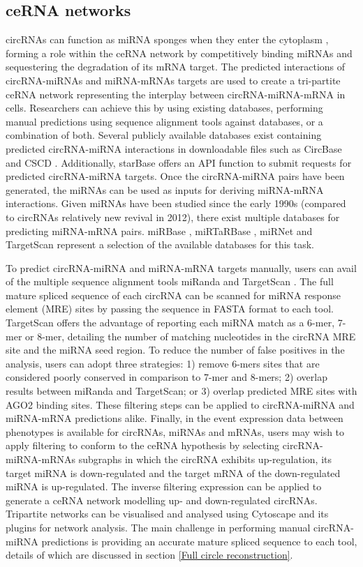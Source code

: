\documentclass[journal,review,submit,pdftex,moreauthors]{Definitions/mdpi}
\begin{document}
\subsection*{ceRNA networks}
circRNAs can function as miRNA sponges when they enter the cytoplasm \cite{Hansen2013Mar, find_circ}, forming a role within the ceRNA network by competitively binding miRNAs and sequestering the degradation of its mRNA target. The predicted interactions of circRNA-miRNAs and miRNA-mRNAs targets are used to create a tri-partite ceRNA network representing the interplay between circRNA-miRNA-mRNA in cells. Researchers can achieve this by using existing databases, performing manual predictions using sequence alignment tools against databases, or a combination of both. Several publicly available databases exist containing predicted circRNA-miRNA interactions in downloadable files such as CircBase \cite{circbase} and CSCD \cite{CSCD}. Additionally, starBase \cite{starbase} offers an API function to submit requests for predicted circRNA-miRNA targets. Once the circRNA-miRNA pairs have been generated, the miRNAs can be used as inputs for deriving miRNA-mRNA interactions. Given miRNAs have been studied since the early 1990s (compared to circRNAs relatively new revival in 2012), there exist multiple databases for predicting miRNA-mRNA pairs. miRBase \cite{mirbase}, miRTaRBase \cite{mirtarbase}, miRNet \cite{mirnet} and TargetScan \cite{Targetscan} represent a selection of the available databases for this task. \par
To predict circRNA-miRNA and miRNA-mRNA targets manually, users can avail of the multiple sequence alignment tools miRanda \cite{miranda} and TargetScan \cite{Targetscan}. The full mature spliced sequence of each circRNA can be scanned for miRNA response element (MRE) sites by passing the sequence in FASTA format to each tool. TargetScan offers the advantage of reporting each miRNA match as a 6-mer, 7-mer or 8-mer, detailing the number of matching nucleotides in the circRNA MRE site and the miRNA seed region. To reduce the number of false positives in the analysis, users can adopt three strategies: 1) remove 6-mers sites that are considered poorly conserved in comparison to 7-mer and 8-mers; 2) overlap results between miRanda and TargetScan; or 3) overlap predicted MRE sites with AGO2 binding sites. These filtering steps can be applied to circRNA-miRNA and miRNA-mRNA predictions alike. Finally, in the event expression data between phenotypes is available for circRNAs, miRNAs and mRNAs, users may wish to apply filtering to conform to the ceRNA hypothesis by selecting circRNA-miRNA-mRNAs subgraphs in which the circRNA exhibits up-regulation, its target miRNA is down-regulated and the target mRNA of the down-regulated miRNA is up-regulated. The inverse filtering expression can be applied to generate a ceRNA network modelling up- and down-regulated circRNAs. Tripartite networks can be visualised and analysed using Cytoscape \cite{cytoscape} and its plugins for network analysis. The main challenge in performing manual circRNA-miRNA predictions is providing an accurate mature spliced sequence to each tool, details of which are discussed in section \ref{Full circle reconstruction}.
\end{document}
